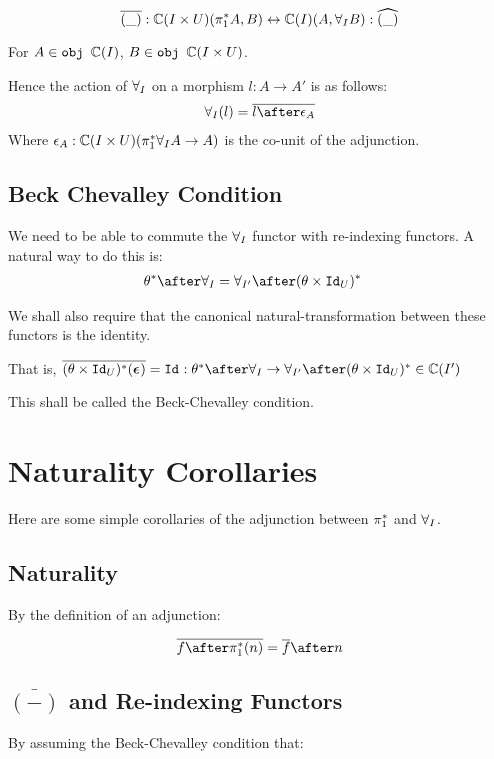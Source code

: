\documentclass{report}
\begin{document}
\begin{equation}
    \bar{(\_)}: \C(I\times U)(\pstar A, B) \leftrightarrow \C(I)(A, \allI B) : \widehat{(\_)}
\end{equation}

For $A\in\texttt{obj }\mathbb{C}(I)$, $B\in\texttt{obj }\mathbb{C}(I\times U)$.

Hence the action of $\forall_I$ on a morphism $l : A\rightarrow A'$ is as follows:
\begin{eqnarray}
    \allI(l) = \bar{l\after\e_A}
\end{eqnarray}
Where $\epsilon_A: \mathbb{C}(I\times U)(\pi_1^*\forall_I A \rightarrow A)$ is the co-unit of the adjunction.

\subsection{Beck Chevalley Condition}
We need to be able to commute the $\forall_I$ functor with re-indexing functors. A natural way to do this is:
\begin{align*}
    \theta\star\after\allI & = \allII\after(\theta\times\Id{U})\star
\end{align*}

We shall also require that the canonical natural-transformation between these functors is the identity.

That is, $\bar{(\theta\times\Id{U})\star(\counit{})} = \Id{}: \theta\star\after\allI \rightarrow \allII\after(\theta\times\Id{U})\star\in \C(I')$

This shall be called the Beck-Chevalley condition.


\section{Naturality Corollaries}
Here are some simple corollaries of the adjunction between $\pi_1^*$ and $\forall_I$.
    
    \subsection{Naturality}
    By the definition of an adjunction:
    
    \begin{equation}
        \bar{f\after\pstar(n)} = \bar{f}\after n
    \end{equation}
    
    \subsection{$\bar{(-)}$ and Re-indexing Functors}
    By assuming the Beck-Chevalley condition that:
    
\end{document}
